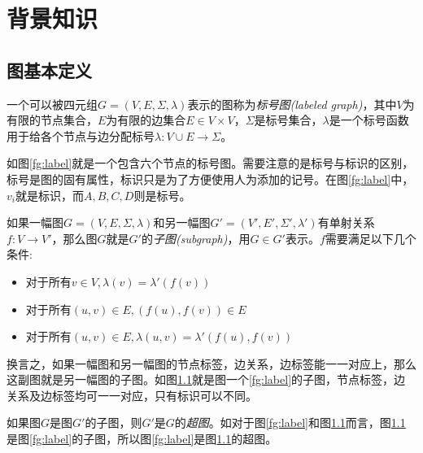 \documentclass{XDBAthesis}
\begin{document}
\else
\fi
\chapter{背景知识}
\label{chap:background}
\section{图基本定义}
\begin{defn}[有向图]
    
\end{defn}

\begin{defn}[标号图]\cite{ghash}
    一个可以被四元组$G=(V,E,\Sigma,\lambda)$表示的图称为\emph{标号图(labeled graph)}，其中$V$为有限的节点集合，$E$为有限的边集合$E\in V\times V$，$\Sigma$是标号集合，$\lambda$是一个标号函数用于给各个节点与边分配标号$\lambda :V\cup E\rightarrow\Sigma$。
\end{defn}
如图\ref{fg:label}就是一个包含六个节点的标号图。需要注意的是标号与标识的区别，标号是图的固有属性，标识只是为了方便使用人为添加的记号。在图\ref{fg:label}中，$v_i $就是标识，而$A,B,C,D$则是标号。

\begin{figure}[htp]
    \begin{minipage}{0.5\textwidth}
        \centering
        
        \label{fg:label}
    \end{minipage}%
    \begin{minipage}{0.5\textwidth}
        \centering
        
        \label{fg:sub}
    \end{minipage}\hfill
\end{figure}
\begin{defn}[子图]
    如果一幅图$G=(V,E,\Sigma,\lambda)$和另一幅图$G'=(V',E',\Sigma',\lambda')$有单射关系$f:V\rightarrow V'$，那么图$G$就是$G'$的\emph{子图(subgraph)}，用$G\in G' $表示。$f$需要满足以下几个条件:
\begin{itemize}
    \item 对于所有$v\in V,\lambda(v)=\lambda '(f(v))$
    \item 对于所有$(u,v)\in E,(f(u),f(v))\in E$
    \item 对于所有$(u,v)\in E,\lambda(u,v)=\lambda '(f(u),f(v)) $
\end{itemize}
\end{defn}
换言之，如果一幅图和另一幅图的节点标签，边关系，边标签能一一对应上，那么这副图就是另一幅图的子图。如图\ref{fg:sub}就是图一个\ref{fg:label}的子图，节点标签，边关系及边标签均可一一对应，只有标识可以不同。
\begin{defn}[超图]
    如果图$G$是图$G'$的子图，则$G'$是$G$的\emph{超图}。如对于图\ref{fg:label}和图\ref{fg:sub}而言，图\ref{fg:sub}是图\ref{fg:label}的子图，所以图\ref{fg:label}是图\ref{fg:sub}的超图。
\end{defn}
\end{document}
